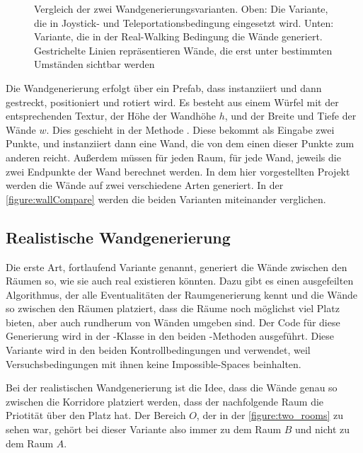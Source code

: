 \begin{figure}[H]
    \centering

    \scalebox{0.4}{}
    \caption{Vergleich der zwei Wandgenerierungsvarianten. Oben: Die  Variante, die in Joystick- und Teleportationsbedingung eingesetzt wird. Unten:  Variante, die in der Real-Walking Bedingung die Wände generiert. Gestrichelte Linien repräsentieren Wände, die erst unter bestimmten Umständen sichtbar werden}
    \label{figure:wallCompare}
\end{figure}

Die Wandgenerierung erfolgt über ein Prefab, dass instanziiert und dann gestreckt, positioniert und rotiert wird. Es besteht aus einem Würfel mit der entsprechenden Textur, der Höhe der Wandhöhe $h$, und der Breite und Tiefe der Wände $w$.
Dies geschieht in der Methode . Diese bekommt als Eingabe zwei Punkte, und instanziiert dann eine Wand, die von dem einen dieser Punkte zum anderen reicht.
Außerdem müssen für jeden Raum, für jede Wand, jeweils die zwei Endpunkte der Wand berechnet werden.
In dem hier vorgestellten Projekt werden die Wände auf zwei verschiedene Arten generiert. In der \autoref{figure:wallCompare} werden die beiden Varianten miteinander verglichen.

\subsection{Realistische Wandgenerierung}\label{subsec:realwallgen}
Die erste Art, fortlaufend  Variante genannt, generiert die Wände zwischen den Räumen so, wie sie auch real existieren könnten.
Dazu gibt es einen ausgefeilten Algorithmus, der alle Eventualitäten der Raumgenerierung kennt und die Wände so zwischen den Räumen platziert, dass die Räume noch möglichst viel Platz bieten, aber auch rundherum von Wänden umgeben sind. Der Code für diese Generierung wird in der -Klasse in den beiden -Methoden ausgeführt. Diese Variante wird in den beiden Kontrollbedingungen  und  verwendet, weil Versuchsbedingungen mit ihnen keine Impossible-Spaces beinhalten.

Bei der realistischen Wandgenerierung ist die Idee, dass die Wände genau so zwischen die Korridore platziert werden, dass der nachfolgende Raum die Priotität über den Platz hat. Der Bereich $O$, der in der \autoref{figure:two_rooms} zu sehen war, gehört bei dieser Variante also immer zu dem Raum $B$ und nicht zu dem Raum $A$.

